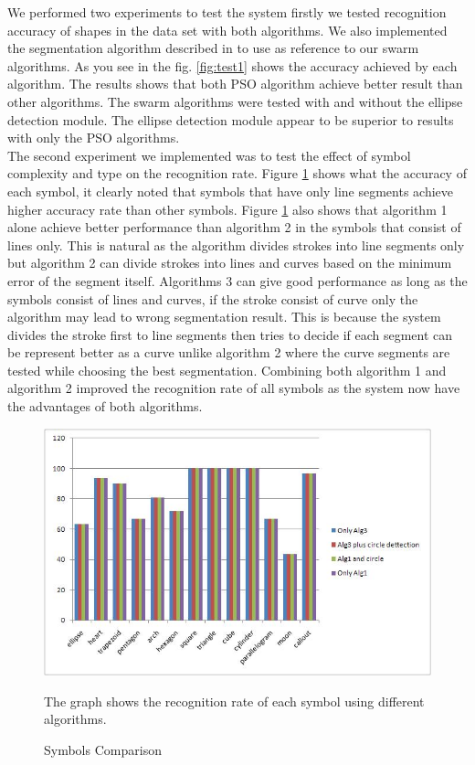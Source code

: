\documentclass[a4paper,10pt]{IEEEconf}
\begin{document}
We performed two experiments to test the system firstly we tested recognition accuracy of shapes in the data set with both algorithms. We also implemented the segmentation algorithm described in \cite{earlyprocess} to use as reference to our swarm algorithms.  As you see in the fig. \ref{fig:test1} shows the accuracy achieved by each algorithm. The results shows that both PSO algorithm achieve better result than other algorithms.  The swarm algorithms were tested with and without the ellipse detection module. The ellipse detection module appear to be superior to results with only the PSO algorithms.\\  

The second experiment we implemented was to test the effect of symbol complexity and type on the recognition rate. Figure \ref{fig:test2} shows what the accuracy of each symbol, it clearly noted that symbols that have only line segments achieve higher accuracy rate than other symbols. Figure \ref{fig:test2} also shows that algorithm 1 alone achieve better performance than algorithm 2 in the symbols that consist of lines only. This is natural as the algorithm divides strokes into line segments only but algorithm 2 can divide  strokes into lines and curves based on the minimum error of the segment itself. Algorithms 3 can give good performance as long as the symbols consist of lines and curves, if the stroke consist of curve only  the algorithm may lead to wrong segmentation result. This is because the system divides the stroke first to line segments then tries to decide if each segment can be represent better as a curve unlike algorithm 2 where the curve segments are tested while choosing the best segmentation.  Combining both algorithm 1 and algorithm 2 improved the recognition rate of all symbols as the system now have the advantages of both algorithms.  \\
\begin{figure}[]
	\centering
		\includegraphics[scale=0.8]{images/test2.jpg}
	\caption{Symbols Comparison} The graph shows the recognition rate of each symbol using different algorithms. 
	\label{fig:test2}
\end{figure}
\end{document}
